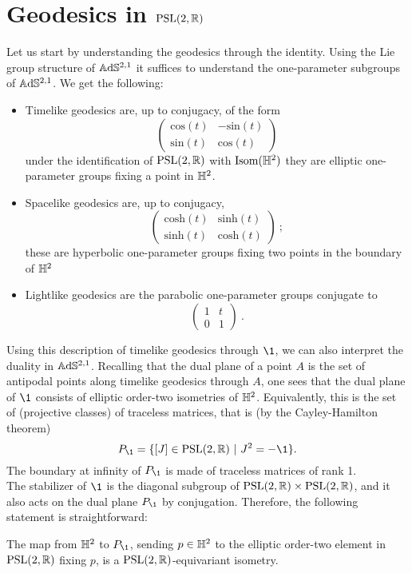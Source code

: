 \section{Geodesics in $\text{PSL}(2,\mathbb{R})$}
Let us start by understanding the geodesics through the identity. Using the Lie group structure of $\mathbb{A}\mathrm{d}\mathbb{S}^{2,1}$ it suffices to understand the one-parameter subgroups of $\mathbb{A}\mathrm{d}\mathbb{S}^{2,1}$. We get the following:
\begin{itemize}
    \item Timelike geodesics are, up to conjugacy, of the form
    \[ \begin{pmatrix}
        \text{cos}(t) & -\text{sin}(t) \\
        \text{sin}(t) & \text{cos}(t)
    \end{pmatrix} \]
    under the identification of $\text{PSL}(2,\mathbb{R})$ with $\text{Isom}(\mathbb{H}^2)$ they are elliptic one-parameter groups fixing a point in $\mathbb{H}^2$.
    \item Spacelike geodesics are, up to conjugacy,
    \[ \begin{pmatrix}
        \text{cosh}(t) & \text{sinh}(t) \\
        \text{sinh}(t) & \text{cosh}(t)
    \end{pmatrix}  \ ; \]
    these are hyperbolic one-parameter groups fixing two points in the boundary of $\mathbb{H}^2$
    \item Lightlike geodesics are the parabolic one-parameter groups conjugate to
    \[ \begin{pmatrix}
        1 & t \\
        0 & 1
    \end{pmatrix} \ . \]
\end{itemize}
Using this description of timelike geodesics through $\1$, we can also interpret the duality in $\mathbb{A}\mathrm{d}\mathbb{S}^{2,1}$. Recalling that the dual plane of a point $A$ is the set of antipodal points along timelike geodesics through $A$, one sees that the dual plane of $\1$ consists of elliptic order-two isometries of $\mathbb{H}^2$. Equivalently, this is the set of (projective classes) of traceless matrices, that is (by the Cayley-Hamilton theorem)
\[
    P_\1 = \{ [J]\in\PSL \ | \ J^2 = -\1 \}.
\]
The boundary at infinity of $P_\1$ is made of traceless matrices of rank 1.\\
The stabilizer of $\1$ is the diagonal subgroup of $\text{PSL}(2,\mathbb{R}) \times \text{PSL}(2,\mathbb{R})$, and it also acts on the dual plane $P_\1$ by conjugation. Therefore, the following statement is straightforward:
\begin{lemma}\label{lem:dual plane}
    The map from $\mathbb{H}^2$ to $P_\1$, sending $p\in\mathbb{H}^2$ to the elliptic order-two element in $\text{PSL}(2,\mathbb{R})$ fixing $p$, is a $\text{PSL}(2,\mathbb{R})$-equivariant isometry.
\end{lemma}


